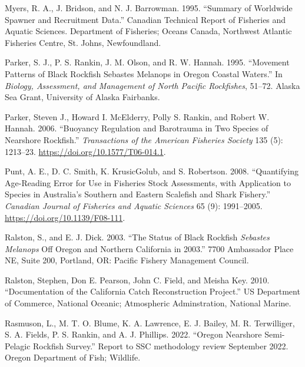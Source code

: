 \documentclass[11pt,
  english,
  letterpaper,
]{article}
\newlength{\cslhangindent}
\newenvironment{CSLReferences}[2] %
 {%
  \setlength{\parindent}{0pt}
  \ifodd #1 \everypar{\setlength{\hangindent}{\cslhangindent}}\ignorespaces\fi
  \ifnum #2 > 0
  \setlength{\parskip}{#2\baselineskip}
  \fi
 }%
 {}
\begin{document}
\begin{CSLReferences}{1}{0}
\leavevmode{}%
Myers, R. A., J. Bridson, and N. J. Barrowman. 1995. {``Summary of Worldwide Spawner and Recruitment Data.''} Canadian Technical Report of Fisheries and Aquatic Sciences. Department of Fisheries; Oceans Canada, Northwest Atlantic Fisheries Centre, St. Johns, Newfoundland.

\leavevmode{}%
Parker, S. J., P. S. Rankin, J. M. Olson, and R. W. Hannah. 1995. {``Movement Patterns of Black Rockfish Sebastes Melanops in Oregon Coastal Waters.''} In \emph{Biology, Assessment, and Management of North Pacific Rockfishes}, 51--72. Alaska Sea Grant, University of Alaska Fairbanks.

\leavevmode{}%
Parker, Steven J., Howard I. McElderry, Polly S. Rankin, and Robert W. Hannah. 2006. {``Buoyancy Regulation and Barotrauma in Two Species of Nearshore Rockfish.''} \emph{Transactions of the American Fisheries Society} 135 (5): 1213--23. \url{https://doi.org/10.1577/T06-014.1}.

\leavevmode{}%
Punt, A. E., D. C. Smith, K. KrusicGolub, and S. Robertson. 2008. {``Quantifying Age-Reading Error for Use in Fisheries Stock Assessments, with Application to Species in {A}ustralia's Southern and Eastern Scalefish and Shark Fishery.''} \emph{Canadian Journal of Fisheries and Aquatic Sciences} 65 (9): 1991--2005. \url{https://doi.org/10.1139/F08-111}.

\leavevmode{}%
Ralston, S., and E. J. Dick. 2003. {``The Status of Black Rockfish \emph{{Sebastes} Melanops} Off Oregon and Northern California in 2003.''} 7700 Ambassador Place NE, Suite 200, Portland, OR: Pacific Fishery Management Council.

\leavevmode{}%
Ralston, Stephen, Don E. Pearson, John C. Field, and Meisha Key. 2010. {``Documentation of the {California} Catch Reconstruction Project.''} US Department of Commerce, National Oceanic; Atmospheric Adminstration, National Marine.

\leavevmode{}%
Rasmuson, L., M. T. O. Blume, K. A. Lawrence, E. J. Bailey, M. R. Terwilliger, S. A. Fields, P. S. Rankin, and A. J. Phillips. 2022. {``Oregon Nearshore Semi-Pelagic Rockfish Survey.''} Report to SSC methodology review September 2022. Oregon Department of Fish; Wildlife.


\end{CSLReferences}
\end{document}
